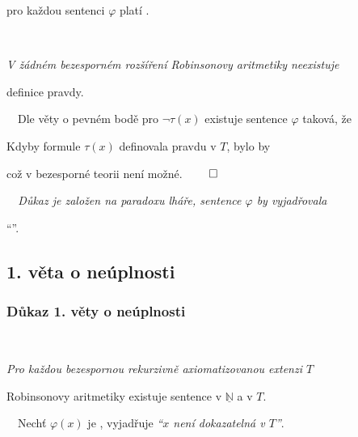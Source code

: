     pro každou sentenci $\varphi$ platí .
    \medskip
    
    \smallskip
    
    {\bf {}}\ \ {\it V žádném bezesporném rozšíření Robinsonovy aritmetiky neexistuje
    \smallskip
    
    definice pravdy.}
    \medskip
    
    \ \ Dle věty o pevném bodě pro $\neg\tau(x)$ existuje sentence $\varphi$ taková, že
    
    
    
    Kdyby formule $\tau(x)$ definovala pravdu v $T$, bylo by
    
    
    
    což v bezesporné teorii není možné. $\qed$
    \medskip
    
    \smallskip
    
    {\it {}\ \ Důkaz je založen na paradoxu lháře, sentence $\varphi$ by vyjadřovala
    \smallskip
    
    ``''.}
    
    
    
    \subsection*{1. věta o neúplnosti}
    \subsubsection*{Důkaz 1. věty o neúplnosti}
    \ \ {\it Pro každou bezespornou rekurzivně axiomatizovanou extenzi $T$
    
    
    Robinsonovy aritmetiky existuje sentence  v $\underline{\mathbb{N}}$ a  v $T$.}
    \medskip
    
    \smallskip
    
    \ \ Nechť $\varphi(x)$ je , vyjadřuje {\it ``$x$ není dokazatelná v $T$''}.
    
